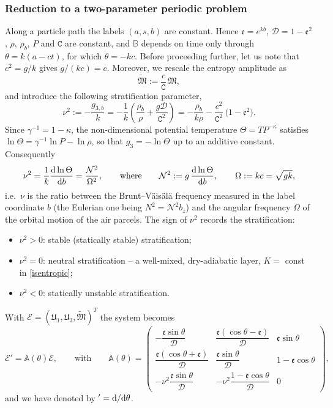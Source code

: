 \documentclass[reqno]{amsart}
\newcommand{\cs}{\texttt{C}}
\newcommand{\B}{{\mathfrak{M}}}
\newcommand{\D}{\mathcal{D}}
\newcommand{\ee}{\mathfrak{e}}
\begin{document}
\subsubsection{Reduction to a two-parameter periodic problem}
Along a particle path the labels $(a,s,b)$ are constant. Hence $\ee=e^{kb}$, $\D=1-\ee^2$, $\rho$, $\rho_b$, $P$ and $\cs$ are constant, and $\mathbb B$ depends on time only through $\theta=k(a-ct)$, for which $\dot\theta=-kc$. Before proceeding further, let us note that $c^2=g/k$ gives $g/(kc)=c$. Moreover, we rescale the entropy amplitude as
\begin{equation}\label{eq:rescale}
\widetilde{\B}:=\frac{c}{\cs}\,\B,
\end{equation}
and introduce the following stratification parameter,
\begin{equation}\label{eq:nu}
\nu^2:=-\frac{g_{3,b}}{k}=-\frac1k\left(\frac{\rho_b}{\rho}+\frac{g\D}{\cs^2}\right)
=-\frac{\rho_b}{k\rho}-\frac{c^2}{\cs^2}\,\bigl(1-\ee^2\bigr).
\end{equation}
Since $\gamma^{-1}=1-\kappa$, the non-dimensional potential temperature $\Theta=T P^{-\kappa}$ satisfies $\ln\Theta=\gamma^{-1}\ln P-\ln\rho$, so that $g_3=-\ln\Theta$ up to an additive constant. Consequently
\begin{equation}\label{eq:nuphys}
\nu^2=\frac{1}{k}\frac{{\rm d}\ln\Theta}{{\rm d}b}=\frac{\mathcal N^2}{\Omega^2},\qquad\text{where}\qquad
\mathcal N^2:=g\,\frac{{\rm d}\ln\Theta}{{\rm d}b},\qquad \Omega:=kc=\sqrt{gk},
\end{equation}
i.e.\ $\nu$ is the ratio between the Brunt--V\"ais\"al\"a frequency measured in the label coordinate $b$ (the Eulerian one being $N^2=\mathcal N^2 b_z$) and the angular frequency $\Omega$ of the orbital motion of the air parcels. The sign of $\nu^2$ records the stratification:
\begin{itemize}
\item $\nu^2>0$: stable (statically stable) stratification;
\item $\nu^2=0$: neutral stratification -- a well-mixed, dry-adiabatic layer, $K=$ const in \eqref{isentropic};
\item $\nu^2<0$: statically unstable stratification.
\end{itemize}
With $\boldsymbol{\mathcal E}=(\mathfrak{U}_1,\mathfrak{U}_3,\widetilde{\B})^T$ the system becomes
\begin{equation}\label{eq:Asys}
\boldsymbol{\mathcal E}'=\mathbb A(\theta)\boldsymbol{\mathcal E},\qquad\text{with}\qquad
\mathbb A(\theta)=
\begin{pmatrix}
-\dfrac{\ee\sin\theta}{\D} & \dfrac{\ee(\cos\theta-\ee)}{\D} & \ee\sin\theta\\[1.2ex]
\dfrac{\ee(\cos\theta+\ee)}{\D} & \dfrac{\ee\sin\theta}{\D} & 1-\ee\cos\theta\\[1.2ex]
-\nu^2\dfrac{\ee\sin\theta}{\D} & -\nu^2\dfrac{1-\ee\cos\theta}{\D} & 0
\end{pmatrix},
\end{equation}
and we have denoted by $'={\rm d}/{\rm d}\theta$.
\end{document}
